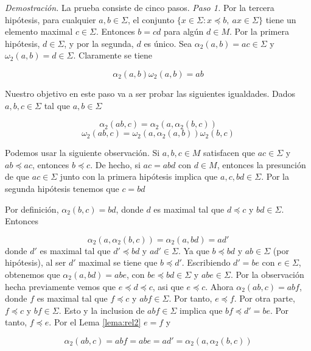 \documentclass[12pt]{article}
\theoremstyle{definition}
\begin{document}
\textit{Demostración.} La prueba consiste de cinco pasos.
\newline
\textit{Paso 1.} Por la tercera hipótesis, para cualquier $a,b\in\Sigma$, el conjunto $\{x\in\Sigma:x\preceq b,\ ax\in\Sigma\}$ tiene un elemento maximal $c\in\Sigma$. Entonces $b=cd$ para algún $d\in M$. Por la primera hipótesis, $d\in\Sigma$, y por la segunda, $d$ es único. Sea $\alpha_2(a,b)=ac\in\Sigma$ y $\omega_2(a,b)=d\in\Sigma$. Claramente se tiene

\begin{equation}
\label{eq:div_max}
\alpha_2(a,b)\omega_2(a,b)=ab
\end{equation}

Nuestro objetivo en este paso va a ser probar las siguientes igualdades. Dados $a,b,c\in\Sigma$ tal que $a,b\in\Sigma$

\begin{equation}
\label{eq:alfa_com}
\alpha_2(ab,c)=\alpha_2(a,\alpha_2(b,c))
\end{equation}
\begin{equation}
\label{eq:omega_com}
\omega_2(ab,c)=\omega_2(a,\alpha_2(a,b))\omega_2(b,c)
\end{equation}

Podemos usar la siguiente observación. Si $a,b,c\in M$ satisfacen que $ac\in\Sigma$ y $ab\preceq ac$, entonces $b\preceq c$. De hecho, si $ac=abd$ con $d\in M$, entonces la presunción de que $ac\in\Sigma$ junto con la primera hipótesis implica que $a,c,bd\in\Sigma$. Por la segunda hipótesis tenemos que $c=bd$

Por definición, $\alpha_2(b,c)=bd$, donde $d$ es maximal tal que $d\preceq c$ y $bd\in \Sigma$. Entonces

$$\alpha_2(a,\alpha_2(b,c))=\alpha_2(a,bd)=ad'$$
\newline
donde $d'$ es maximal tal que $d'\preceq bd$ y $ad'\in\Sigma$. Ya que $b\preceq bd$ y $ab\in\Sigma$ (por hipótesis), al ser $d'$ maximal se tiene que $b\preceq d'$. Escribiendo $d'=be$ con $e\in\Sigma$, obtenemos que $\alpha_2(a,bd)=abe$, con $be\preceq bd\in\Sigma$ y $abe\in\Sigma$. Por la observación hecha previamente vemos que $e\preceq d\preceq c$, asi que $e\preceq c$. Ahora $\alpha_2(ab,c)=abf$, donde $f$ es maximal tal que $f\preceq c$ y $abf\in\Sigma$. Por tanto, $e\preceq f$. Por otra parte, $f\preceq c$ y $bf\in\Sigma$. Esto y la inclusion de $abf\in\Sigma$ implica que $bf\preceq d' = be$. Por tanto, $f\preceq e$. Por el Lema \ref{lema:rel2} $e=f$ y

$$\alpha_2(ab,c)=abf=abe=ad'=\alpha_2(a,\alpha_2(b,c))$$
\end{document}
